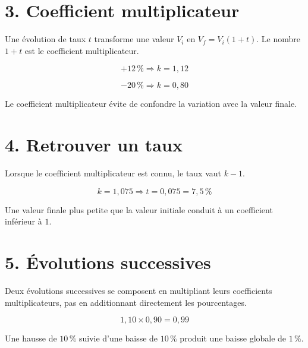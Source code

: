 
\section{3. Coefficient multiplicateur}
Une évolution de taux $t$ transforme une valeur $V_i$ en $V_f=V_i(1+t)$. Le nombre $1+t$ est le coefficient multiplicateur.

\[
+12\,\%\Rightarrow k=1{,}12
\]

\[
-20\,\%\Rightarrow k=0{,}80
\]

\begin{exemple}
Le coefficient multiplicateur évite de confondre la variation avec la valeur finale.
\end{exemple}

\section{4. Retrouver un taux}
Lorsque le coefficient multiplicateur est connu, le taux vaut $k-1$.

\[
k=1{,}075\Rightarrow t=0{,}075=7{,}5\,\%
\]

\begin{exemple}
Une valeur finale plus petite que la valeur initiale conduit à un coefficient inférieur à $1$.
\end{exemple}

\section{5. Évolutions successives}
Deux évolutions successives se composent en multipliant leurs coefficients multiplicateurs, pas en additionnant directement les pourcentages.

\[
1{,}10\times0{,}90=0{,}99
\]

\begin{exemple}
Une hausse de $10\,\%$ suivie d’une baisse de $10\,\%$ produit une baisse globale de $1\,\%$.
\end{exemple}


